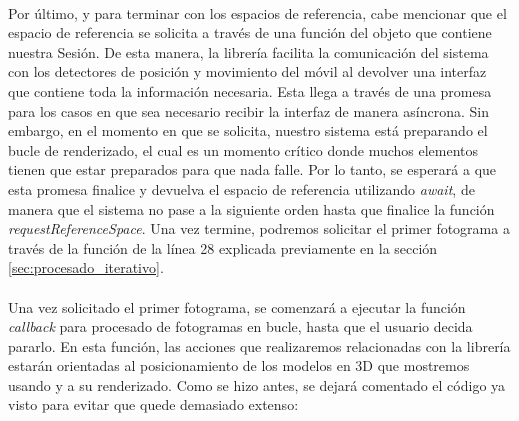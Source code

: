 \documentclass{subfiles}
\begin{document}
        \paragraph{}
        Por último, y para terminar con los espacios de referencia, cabe mencionar que el espacio de referencia se solicita a través de una función del objeto que contiene nuestra Sesión. De esta manera, la librería facilita la comunicación del sistema con los detectores de posición y movimiento del móvil al devolver una interfaz que contiene toda la información necesaria. Esta llega a través de una promesa para los casos en que sea necesario recibir la interfaz de manera asíncrona. Sin embargo, en el momento en que se solicita, nuestro sistema está preparando el bucle de renderizado, el cual es un momento crítico donde muchos elementos tienen que estar preparados para que nada falle. Por lo tanto, se esperará a que esta promesa finalice y devuelva el espacio de referencia utilizando \textit{await}, de manera que el sistema no pase a la siguiente orden hasta que finalice la función \textit{requestReferenceSpace}. Una vez termine, podremos solicitar el primer fotograma a través de la función de la línea 28 explicada previamente en la sección \ref{sec:procesado_iterativo}.

        \paragraph{}
        Una vez solicitado el primer fotograma, se comenzará a ejecutar la función \textit{callback} para procesado de fotogramas en bucle, hasta que el usuario decida pararlo. En esta función, las acciones que realizaremos relacionadas con la librería \threejs estarán orientadas al posicionamiento de los modelos en 3D que mostremos usando \ra y a su renderizado. Como se hizo antes, se dejará comentado el código ya visto para evitar que quede demasiado extenso:
\end{document}
